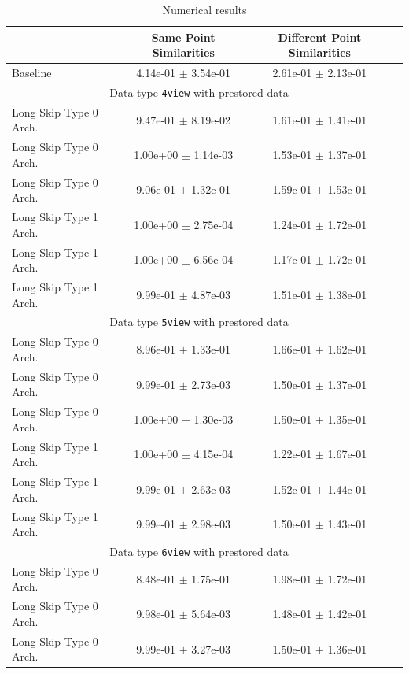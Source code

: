 \documentclass[a4paper]{article}
\begin{document}
\begin{table}[H]
  \caption{Numerical results}
      \begin{tabular}{|l|c|c|c|} \hline
                                      &  Same Point Similarities  &  Different Point Similarities  \\ \hline
Baseline   & 4.14e-01 $\pm$ 3.54e-01 & 2.61e-01 $\pm$ 2.13e-01 \\ \hline
\multicolumn{3}{|c|}{Data type \texttt{4view} with prestored data} \\ \hline
Long Skip Type 0 Arch.   & 9.47e-01 $\pm$ 8.19e-02 & 1.61e-01 $\pm$ 1.41e-01 \\ \hline
Long Skip Type 0 Arch.   & 1.00e+00 $\pm$ 1.14e-03 & 1.53e-01 $\pm$ 1.37e-01 \\ \hline
Long Skip Type 0 Arch.   & 9.06e-01 $\pm$ 1.32e-01 & 1.59e-01 $\pm$ 1.53e-01 \\ \hline
Long Skip Type 1 Arch.   & 1.00e+00 $\pm$ 2.75e-04 & 1.24e-01 $\pm$ 1.72e-01 \\ \hline
Long Skip Type 1 Arch.   & 1.00e+00 $\pm$ 6.56e-04 & 1.17e-01 $\pm$ 1.72e-01 \\ \hline
Long Skip Type 1 Arch.   & 9.99e-01 $\pm$ 4.87e-03 & 1.51e-01 $\pm$ 1.38e-01 \\ \hline
\multicolumn{3}{|c|}{Data type \texttt{5view} with prestored data} \\ \hline
Long Skip Type 0 Arch.   & 8.96e-01 $\pm$ 1.33e-01 & 1.66e-01 $\pm$ 1.62e-01 \\ \hline
Long Skip Type 0 Arch.   & 9.99e-01 $\pm$ 2.73e-03 & 1.50e-01 $\pm$ 1.37e-01 \\ \hline
Long Skip Type 0 Arch.   & 1.00e+00 $\pm$ 1.30e-03 & 1.50e-01 $\pm$ 1.35e-01 \\ \hline
Long Skip Type 1 Arch.   & 1.00e+00 $\pm$ 4.15e-04 & 1.22e-01 $\pm$ 1.67e-01 \\ \hline
Long Skip Type 1 Arch.   & 9.99e-01 $\pm$ 2.63e-03 & 1.52e-01 $\pm$ 1.44e-01 \\ \hline
Long Skip Type 1 Arch.   & 9.99e-01 $\pm$ 2.98e-03 & 1.50e-01 $\pm$ 1.43e-01 \\ \hline
\multicolumn{3}{|c|}{Data type \texttt{6view} with prestored data} \\ \hline
Long Skip Type 0 Arch.   & 8.48e-01 $\pm$ 1.75e-01 & 1.98e-01 $\pm$ 1.72e-01 \\ \hline
Long Skip Type 0 Arch.   & 9.98e-01 $\pm$ 5.64e-03 & 1.48e-01 $\pm$ 1.42e-01 \\ \hline
Long Skip Type 0 Arch.   & 9.99e-01 $\pm$ 3.27e-03 & 1.50e-01 $\pm$ 1.36e-01 \\ \hline

\end{tabular}
\end{table}
\end{document}
